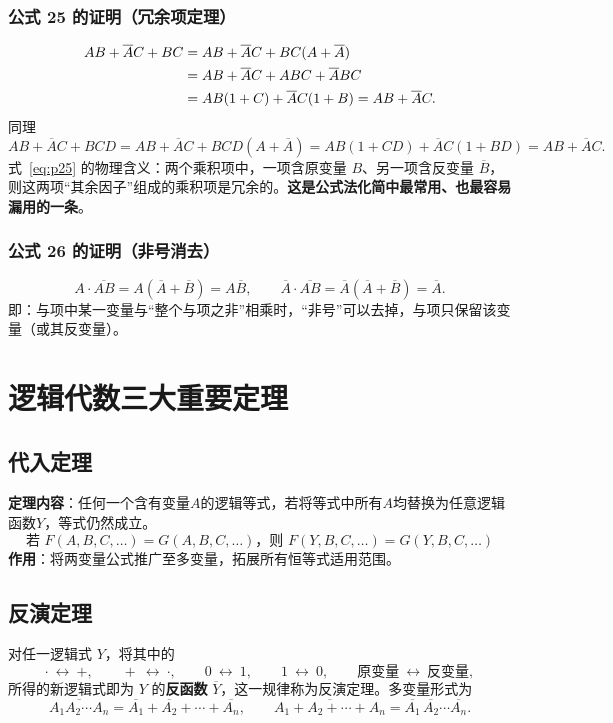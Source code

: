 \subsubsection{公式 25 的证明（冗余项定理）}
\begin{align}
AB+\overline{A}C+BC &= AB+\overline{A}C+BC(A+\overline{A}) \notag\\
&= AB+\overline{A}C+ABC+\overline{A}BC \notag\\
&= AB(1+C)+\overline{A}C(1+B)=AB+\overline{A}C. \label{eq:p25}
\end{align}
同理
\[
AB+\overline{A}C+BCD=AB+\overline{A}C+BCD(A+\overline{A})
=AB(1+CD)+\overline{A}C(1+BD)=AB+\overline{A}C .
\]
式~\eqref{eq:p25} 的物理含义：两个乘积项中，一项含原变量 $B$、另一项含反变量 $\overline{B}$，则这两项``其余因子''组成的乘积项是冗余的。\textbf{这是公式法化简中最常用、也最容易漏用的一条}。

\subsubsection{公式 26 的证明（非号消去）}
\[
A\cdot\overline{AB}=A(\overline{A}+\overline{B})=A\overline{B},\qquad
\overline{A}\cdot\overline{AB}=\overline{A}(\overline{A}+\overline{B})=\overline{A}.
\]
即：与项中某一变量与``整个与项之非''相乘时，``非号''可以去掉，与项只保留该变量（或其反变量）。

\section{逻辑代数三大重要定理}
\subsection{代入定理}
\textbf{定理内容}：任何一个含有变量$A$的逻辑等式，若将等式中所有$A$均替换为任意逻辑函数$Y$，等式仍然成立。
\[
\text{若 } F(A,B,C,\dots)=G(A,B,C,\dots) \text{，则 } F(Y,B,C,\dots)=G(Y,B,C,\dots)
\]
\textbf{作用}：将两变量公式推广至多变量，拓展所有恒等式适用范围。

\subsection{反演定理}
对任一逻辑式 $Y$，将其中的
\[
\cdot\ \longleftrightarrow\ +,\qquad
+\ \longleftrightarrow\ \cdot,\qquad
0\ \longleftrightarrow\ 1,\qquad
1\ \longleftrightarrow\ 0,\qquad
\text{原变量}\ \longleftrightarrow\ \text{反变量},
\]
所得的新逻辑式即为 $Y$ 的\textbf{反函数} $\overline{Y}$，这一规律称为反演定理。多变量形式为
\[
\overline{A_1A_2\cdots A_n} = \overline{A_1}+\overline{A_2}+\cdots+\overline{A_n},\qquad
\overline{A_1+A_2+\cdots+A_n} = \overline{A_1}\,\overline{A_2}\cdots\overline{A_n}.
\]

